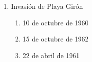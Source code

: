 \documentclass[twocolumn]{article}
\begin{document}
\begin{enumerate}
\begin{enumerate}
  \end{enumerate}



  \item Invasión de Playa Girón

  \begin{enumerate}
   
   \item 10 de octubre de 1960
   
   \item 15 de octubre de 1962
   
   \item 22 de abril de 1961
   
  \end{enumerate}


\end{enumerate}


\end{document}
